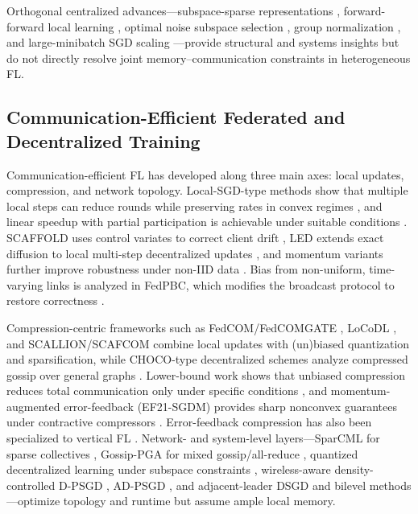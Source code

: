 \documentclass[11pt]{article}
\begin{document}
Orthogonal centralized advances---subspace-sparse representations \citep{Yang2015LearningW}, forward-forward local learning \citep{Hinton2022TheFA}, optimal noise subspace selection \citep{xu2023determine}, group normalization \citep{wu2018group}, and large-minibatch SGD scaling \citep{Goyal2017AccurateLM}---provide structural and systems insights but do not directly resolve joint memory--communication constraints in heterogeneous FL.

\subsection{Communication-Efficient Federated and Decentralized Training}

Communication-efficient FL has developed along three main axes: local updates, compression, and network topology. Local-SGD-type methods show that multiple local steps can reduce rounds while preserving rates in convex regimes \citep{Stich2018LocalSC,qu2023unified}, and linear speedup with partial participation is achievable under suitable conditions \citep{Yang2021AchievingLS}. SCAFFOLD uses control variates to correct client drift \citep{karimireddy2020scaffold}, LED extends exact diffusion to local multi-step decentralized updates \citep{Alghunaim2023LocalEF}, and momentum variants further improve robustness under non-IID data \citep{Cheng2023MomentumBN}. Bias from non-uniform, time-varying links is analyzed in FedPBC, which modifies the broadcast protocol to restore correctness \citep{xiang2023towards}.

Compression-centric frameworks such as FedCOM/FedCOMGATE \citep{Haddadpour2020FederatedLW}, LoCoDL \citep{Condat2024LoCoDLCD}, and SCALLION/SCAFCOM \citep{Huang2023StochasticCA} combine local updates with (un)biased quantization and sparsification, while CHOCO-type decentralized schemes analyze compressed gossip over general graphs \citep{Koloskova2019DecentralizedSO}. Lower-bound work shows that unbiased compression reduces total communication only under specific conditions \citep{He2023UnbiasedCS,He2023LowerBA}, and momentum-augmented error-feedback (EF21-SGDM) provides sharp nonconvex guarantees under contractive compressors \citep{Fatkhullin2023MomentumPI}. Error-feedback compression has also been specialized to vertical FL \citep{Valdeira2024CommunicationefficientVF}. Network- and system-level layers---SparCML for sparse collectives \citep{Renggli2018SparCMLHS}, Gossip-PGA for mixed gossip/all-reduce \citep{chen2021accelerating}, quantized decentralized learning under subspace constraints \citep{Nassif2022QuantizationFD}, wireless-aware density-controlled D-PSGD \citep{Sato2020NetworkDensityControlledDP}, AD-PSGD \citep{Lian2017AsynchronousDP}, and adjacent-leader DSGD and bilevel methods \citep{He2024AdjacentLD,Wen2024ACA}---optimize topology and runtime but assume ample local memory.
\end{document}

